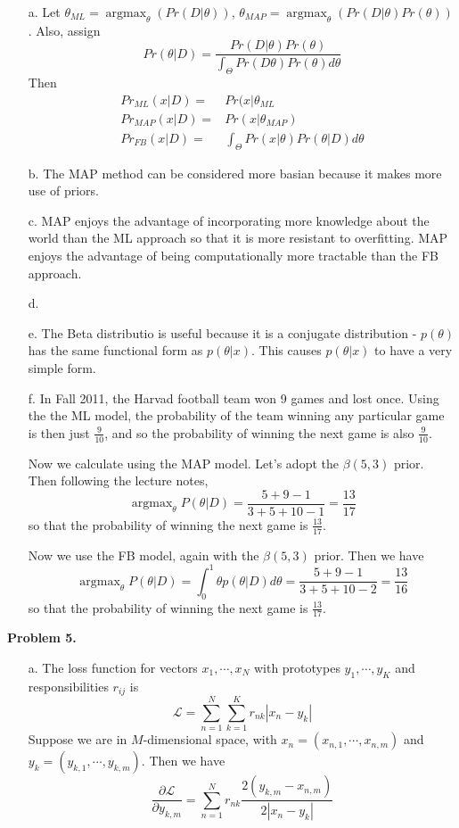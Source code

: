 \documentclass[12pt]{amsart}
\DeclareMathOperator{\argmax}{argmax}
\theoremstyle{remark}
\begin{document}
\begin{enumerate}
\item[a.]
Let $\theta_{ML} = \argmax_{\theta}(Pr(D|\theta))$, $\theta_{MAP}=\argmax_{\theta}(Pr(D|\theta)Pr(\theta))$. Also, assign
\[
Pr(\theta|D) = \frac{Pr(D|\theta)Pr(\theta)}{\int_{\Theta} Pr(D\theta)Pr(\theta)d\theta}
\]
Then
\begin{align*}
Pr_{ML}(x|D) =& Pr(x|\theta_{ML}\\
Pr_{MAP}(x|D) = & Pr(x|\theta_{MAP})\\
Pr_{FB}(x|D) = & \int_{\Theta} Pr(x|\theta)Pr(\theta|D) d\theta
\end{align*}


\item[b.]
The MAP method can be considered more basian because it makes more use of priors.

\item[c.]
MAP enjoys the advantage of incorporating more knowledge about the world than the ML approach so that it is more resistant to overfitting. MAP enjoys the advantage of being computationally more tractable than the FB approach.

\item[d.]

\item[e.]
The Beta distributio is useful because it is a conjugate distribution - $p(\theta)$ has the same functional form as $p(\theta|x)$. This causes $p(\theta|x)$ to have a very simple form.

\item[f.]
In Fall 2011, the Harvad football team won 9 games and lost once. Using the the ML model, the probability of the team winning any particular game is then just $\frac{9}{10}$, and so the probability of winning the next game is also $\frac{9}{10}$.

Now we calculate using the MAP model. Let's adopt the $\beta(5,3)$ prior. Then following the lecture notes, 
\[
\argmax_{\theta}P(\theta|D) = \frac{5+9-1}{3+5+10-1}=\frac{13}{17}
\]
so that the probability of winning the next game is $\frac{13}{17}$.

Now we use the FB model, again with the $\beta(5,3)$ prior. Then we have
\[
\argmax_{\theta}P(\theta|D) = \int_{0}^1 \theta p(\theta|D) d\theta=\frac{5+9-1}{3+5+10-2}=\frac{13}{16}
\]
so that the probability of winning the next game is $\frac{13}{17}$.
\end{enumerate}
\noindent \textbf{Problem 5.}
\begin{enumerate}
\item[a.]
The loss function for vectors $x_1,\cdots,x_N$ with prototypes $y_1,\cdots,y_K$ and responsibilities $r_{ij}$ is
\[
\mathcal{L} = \sum_{n=1}^N \sum_{k=1}^K r_{nk}|x_n-y_k|
\]
Suppose we are in $M$-dimensional space, with $x_n=(x_{n,1},\cdots,x_{n,m})$ and $y_k=(y_{k,1},\cdots,y_{k,m})$. Then we have
\[
\frac{\partial \mathcal{L}}{\partial y_{k,m}}=\sum_{n=1}^N r_{nk}\frac{2(y_{k,m}-x_{n,m})}{2|x_n-y_k|}
\]

\end{enumerate}
\end{document}
